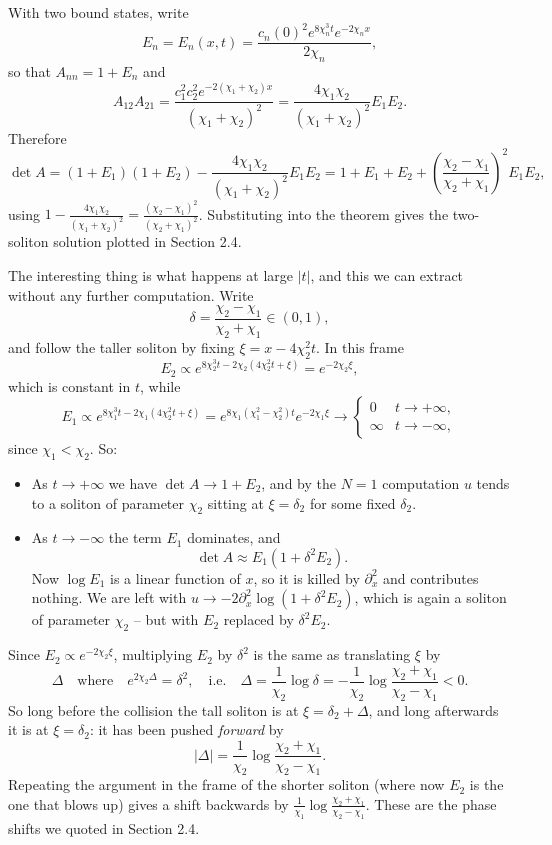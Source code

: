\documentclass[a4paper]{scrartcl}
\begin{document}
\begin{example}[$N=2$]
	With two bound states, write
	$$
	E_n = E_n(x,t) = \frac{c_n(0)^2e^{8\chi_n^3t}e^{-2\chi_nx}}{2\chi_n},
	$$
	so that $A_{nn} = 1 + E_n$ and
	$$
	A_{12}A_{21} = \frac{c_1^2c_2^2e^{-2(\chi_1+\chi_2)x}}{(\chi_1+\chi_2)^2} = \frac{4\chi_1\chi_2}{(\chi_1+\chi_2)^2}E_1E_2.
	$$
	Therefore
	$$
	\det A = (1+E_1)(1+E_2) - \frac{4\chi_1\chi_2}{(\chi_1+\chi_2)^2}E_1E_2 = 1 + E_1 + E_2 + \left(\frac{\chi_2-\chi_1}{\chi_2+\chi_1}\right)^2E_1E_2,
	$$
	using $1 - \frac{4\chi_1\chi_2}{(\chi_1+\chi_2)^2} = \frac{(\chi_2-\chi_1)^2}{(\chi_2+\chi_1)^2}$. Substituting into the theorem gives the two-soliton solution plotted in Section 2.4.

	The interesting thing is what happens at large $|t|$, and this we can extract without any further computation. Write
	$$
	\delta = \frac{\chi_2-\chi_1}{\chi_2+\chi_1}\in(0,1),
	$$
	and follow the taller soliton by fixing $\xi = x - 4\chi_2^2t$. In this frame
	$$
	E_2 \propto e^{8\chi_2^3t - 2\chi_2(4\chi_2^2t+\xi)} = e^{-2\chi_2\xi},
	$$
	which is constant in $t$, while
	$$
	E_1\propto e^{8\chi_1^3t - 2\chi_1(4\chi_2^2t + \xi)} = e^{8\chi_1(\chi_1^2-\chi_2^2)t}e^{-2\chi_1\xi}\longrightarrow\begin{cases}0 & t\to+\infty,\\ \infty & t\to-\infty,\end{cases}
	$$
	since $\chi_1 < \chi_2$. So:
	\begin{itemize}
		\item As $t\to+\infty$ we have $\det A\to 1 + E_2$, and by the $N=1$ computation $u$ tends to a soliton of parameter $\chi_2$ sitting at $\xi = \delta_2$ for some fixed $\delta_2$.
		\item As $t\to-\infty$ the term $E_1$ dominates, and
		$$
		\det A \approx E_1\left(1 + \delta^2E_2\right).
		$$
		Now $\log E_1$ is a linear function of $x$, so it is killed by $\partial_x^2$ and contributes nothing. We are left with $u\to-2\partial_x^2\log(1+\delta^2E_2)$, which is again a soliton of parameter $\chi_2$ -- but with $E_2$ replaced by $\delta^2E_2$.
	\end{itemize}
	Since $E_2\propto e^{-2\chi_2\xi}$, multiplying $E_2$ by $\delta^2$ is the same as translating $\xi$ by
	$$
	\Delta \quad\text{where}\quad e^{2\chi_2\Delta} = \delta^2, \quad\text{i.e.}\quad \Delta = \frac{1}{\chi_2}\log\delta = -\frac{1}{\chi_2}\log\frac{\chi_2+\chi_1}{\chi_2-\chi_1} < 0.
	$$
	So long before the collision the tall soliton is at $\xi = \delta_2 + \Delta$, and long afterwards it is at $\xi = \delta_2$: it has been pushed \emph{forward} by
	$$
	|\Delta| = \frac{1}{\chi_2}\log\frac{\chi_2+\chi_1}{\chi_2-\chi_1}.
	$$
	Repeating the argument in the frame of the shorter soliton (where now $E_2$ is the one that blows up) gives a shift backwards by $\frac{1}{\chi_1}\log\frac{\chi_2+\chi_1}{\chi_2-\chi_1}$. These are the phase shifts we quoted in Section 2.4.
\end{example}
\end{document}
